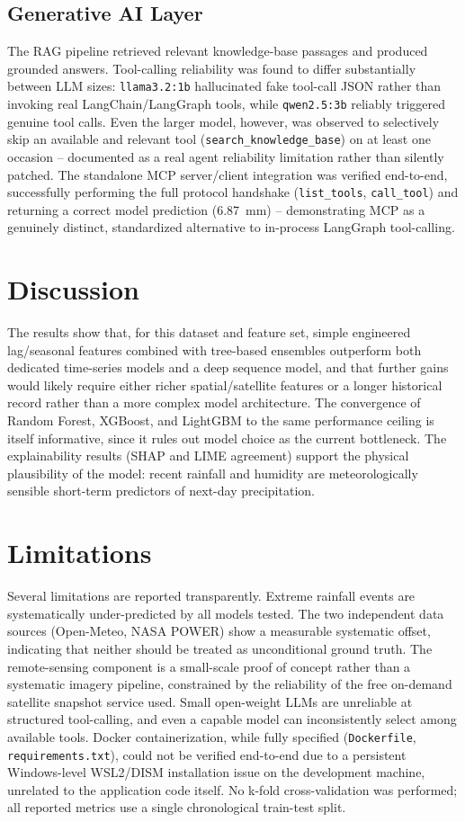 \documentclass[11pt]{article}
\begin{document}
\subsection{Generative AI Layer}
The RAG pipeline retrieved relevant knowledge-base passages and produced grounded answers. Tool-calling reliability was found to differ substantially between LLM sizes: \texttt{llama3.2:1b} hallucinated fake tool-call JSON rather than invoking real LangChain/LangGraph tools, while \texttt{qwen2.5:3b} reliably triggered genuine tool calls. Even the larger model, however, was observed to selectively skip an available and relevant tool (\texttt{search\_knowledge\_base}) on at least one occasion -- documented as a real agent reliability limitation rather than silently patched. The standalone MCP server/client integration was verified end-to-end, successfully performing the full protocol handshake (\texttt{list\_tools}, \texttt{call\_tool}) and returning a correct model prediction (6.87~mm) -- demonstrating MCP as a genuinely distinct, standardized alternative to in-process LangGraph tool-calling.

\section{Discussion}
The results show that, for this dataset and feature set, simple engineered lag/seasonal features combined with tree-based ensembles outperform both dedicated time-series models and a deep sequence model, and that further gains would likely require either richer spatial/satellite features or a longer historical record rather than a more complex model architecture. The convergence of Random Forest, XGBoost, and LightGBM to the same performance ceiling is itself informative, since it rules out model choice as the current bottleneck. The explainability results (SHAP and LIME agreement) support the physical plausibility of the model: recent rainfall and humidity are meteorologically sensible short-term predictors of next-day precipitation.

\section{Limitations}
Several limitations are reported transparently. Extreme rainfall events are systematically under-predicted by all models tested. The two independent data sources (Open-Meteo, NASA POWER) show a measurable systematic offset, indicating that neither should be treated as unconditional ground truth. The remote-sensing component is a small-scale proof of concept rather than a systematic imagery pipeline, constrained by the reliability of the free on-demand satellite snapshot service used. Small open-weight LLMs are unreliable at structured tool-calling, and even a capable model can inconsistently select among available tools. Docker containerization, while fully specified (\texttt{Dockerfile}, \texttt{requirements.txt}), could not be verified end-to-end due to a persistent Windows-level WSL2/DISM installation issue on the development machine, unrelated to the application code itself. No k-fold cross-validation was performed; all reported metrics use a single chronological train-test split.
\end{document}
